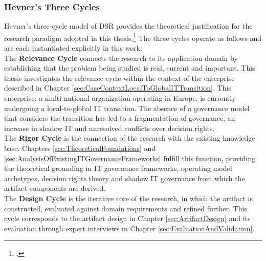 \subsubsection{Hevner's Three Cycles}
\label{subsubsec:HevnerThreeCycles}
Hevner's three-cycle model of \ac{DSR} provides the theoretical justification for the research paradigm adopted in this thesis.\footcite[75]{hevnerDesignScienceInformation2004}
The three cycles operate as follows and are each instantiated explicitly in this work:
\\
The \textbf{Relevance Cycle} connects the research to its application domain by establishing that the problem being studied is real, current and important.
This thesis investigates the relevance cycle within the context of the enterprise described in Chapter \ref{sec:CaseContextLocalToGlobalITTransition}.
This enterprise, a multi-national organization operating in Europe, is currently undergoing a local-to-global IT transition.
The absence of a governance model that considers the transition has led to a fragmentation of governance, an increase in shadow IT and unresolved conflicts over decision rights.
\\
The \textbf{Rigor Cycle} is the connection of the research with the existing knowledge base.
Chapters \ref{sec:TheoreticalFoundations} and \ref{sec:AnalysisOfExistingITGovernanceFrameworks} fulfill this function, providing the theoretical grounding in IT governance frameworks, operating model archetypes, decision rights theory and shadow IT governance from which the artifact components are derived.
\\
The \textbf{Design Cycle} is the iterative core of the research, in which the artifact is constructed, evaluated against domain requirements and refined further.
This cycle corresponds to the artifact design in Chapter \ref{sec:ArtifactDesign} and its evaluation through expert interviews in Chapter \ref{sec:EvaluationAndValidation}.

